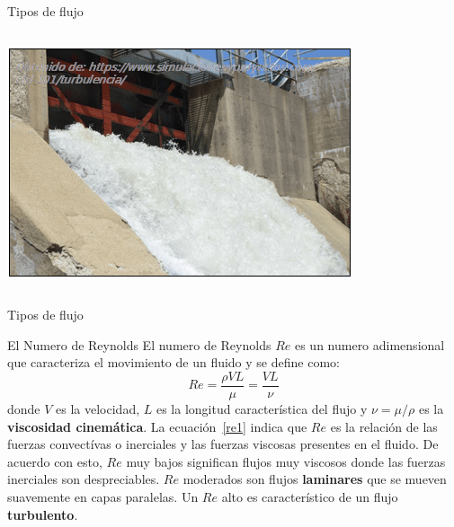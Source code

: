 \documentclass [xcolor=svgnames, t] {beamer}
\begin{document}
\begin{frame}{Tipos de flujo}
\begin{columns}
\begin{textblock*}{6cm}
\includegraphics[width=\textwidth]{ftur4}
\end{textblock*}
\end{columns}
\end{frame}


\begin{frame}{Tipos de flujo}
\begin{block}{El Numero de Reynolds}
El numero de Reynolds $Re$ es un numero adimensional que caracteriza el movimiento de un fluido y se define como:
\begin{equation}
Re=\frac{\rho VL}{\mu}=\frac{VL}{\nu}
\label{re1}
\end{equation}
donde $V$ es la velocidad, $L$ es la longitud caracter\'istica del flujo y $\nu=\mu/\rho$  es la \textbf{viscosidad cinem\'atica}. La ecuaci\'on~\ref{re1} indica que $Re$ es la relaci\'on de las fuerzas convect\'ivas o inerciales y las fuerzas viscosas presentes en el fluido. De acuerdo con esto, $Re$ muy bajos significan flujos muy viscosos donde las fuerzas inerciales son despreciables. $Re$ moderados son flujos \textbf{laminares} que se mueven suavemente en capas paralelas. Un $Re$ alto es caracter\'istico de un flujo \textbf{turbulento}.  
\end{block}
\end{frame}
\end{document}
